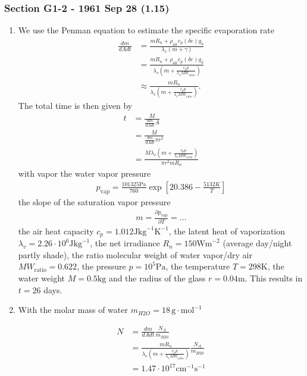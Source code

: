 \documentclass[10pt,a4paper]{article}
\theoremstyle{definition}
\begin{document}
\subsubsection{Section G1-2 - 1961 Sep 28 (1.15)}
\begin{enumerate}[label=(\alph*)]
\item  We use the Penman equation to estimate the specific evaporation rate
\begin{align}
    \frac{dm}{dA dt}
    &=\frac{m R_n + \rho_\text{air}c_p (\delta e)g_a}{\lambda_v(m+\gamma)}\\
    &=\frac{m R_n + \rho_\text{air}c_p (\delta e)g_a}{\lambda_v(m+\frac{c_p p}{\lambda_v MW_\text{ratio}})}\\
    &\approx\frac{m R_n}{\lambda_v(m+\frac{c_p p}{\lambda_v MW_\text{ratio}})}.
\end{align}
The total time is then given by
\begin{align}
    t&=\frac{M}{\frac{dm}{dA dt}A}\\
    &=\frac{M}{\frac{dm}{dA dt}\pi r^2}\\
    &=\frac{M\lambda_v(m+\frac{c_p p}{\lambda_v MW_\text{ratio}})}{\pi r^2 m R_n }
\end{align}
with vapor the water vapor pressure
\begin{align}
    p_\text{vap}=\frac{101325\text{Pa}}{760} \exp\left[20.386 - \frac{5132K}{T}\right]
\end{align}
the slope of the saturation vapor pressure
\begin{align}
    m=\frac{\partial p_\text{vap}}{\partial T}=...
\end{align}
the air heat capacity $c_p=1.012\text{J}\text{kg}^{-1}\text{K}^{-1}$, the latent heat of vaporization $\lambda_v=2.26\cdot10^6 \text{J}\text{kg}^{-1}$, the net irradiance $R_n=150\text{Wm}^{-2}$ (average day/night partly shade), the ratio molecular weight of water vapor/dry air $MW_\text{ratio}=0.622$, the pressure $p=10^5\text{Pa}$, the temperature $T= 298\text{K}$, the water weight $M=0.5\text{kg}$ and the radius of the glass $r=0.04\text{m}$. This results in $t=26$ days.

\item With the molar mass of water $m_{H2O}=18\,\text{g}\cdot\text{mol}^{-1}$

\begin{align}
    N&=\frac{dm}{dA dt} \frac{N_A}{m_{H20}}\\
    &=\frac{m R_n}{\lambda_v(m+\frac{c_p p}{\lambda_v MW_\text{ratio}})}\frac{N_A}{m_{H20}}\\
    &=1.47\cdot10^{17}\text{cm}^{-1}\text{s}^{-1}
\end{align}


\end{enumerate}
\end{document}
